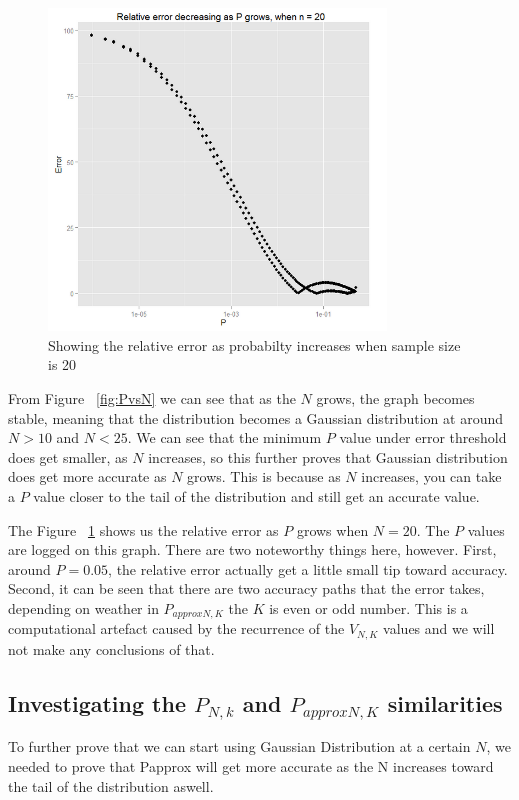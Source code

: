 \documentclass[12pt]{article}
\begin{document}
\begin{figure}[!ht]
	\centering
  \includegraphics[width=0.8\textwidth]{RelativeErrorDecreasingPgrowsN20}
	\caption{Showing the relative error as probabilty increases when sample size is 20}
	\label{fig:RelativeErrorDecresingPgrows}
\end{figure}

From Figure ~\ref{fig:PvsN} we can see that as the $N$ grows, the graph becomes stable, meaning that the distribution becomes a Gaussian distribution at around $N > 10$ and $N < 25$. We can see that the minimum $P$ value under error threshold does get smaller, as $N$ increases, so this further proves that Gaussian distribution does get more accurate as $N$ grows. This is because as $N$ increases, you can take a $P$ value closer to the tail of the distribution and still get an accurate value.

The Figure ~\ref{fig:RelativeErrorDecresingPgrows} shows us the relative error as $P$ grows when $N = 20$. The $P$ values are logged on this graph. There are two noteworthy things here, however. First, around $P = 0.05$, the relative error actually get a little small tip toward accuracy. Second, it can be seen that there are two accuracy paths that the error takes, depending on weather in $P_{approx N, K}$  the $K$ is even or odd number. This is a computational artefact caused by the recurrence of the $V_{N, K}$ values and we will not make any conclusions of that.

\subsection{Investigating the $P_{N, k}$ and $P_{approx N, K}$ similarities}
To further prove that we can start using Gaussian Distribution at a certain $N$, we needed to prove that Papprox will get more accurate as the N increases toward the tail of the distribution aswell.
\end{document}
